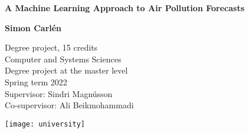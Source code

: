 \begin{titlepage}
    \begin{center}
        \vspace*{2cm}
            
        \Huge
        \textbf{A Machine Learning Approach to Air Pollution Forecasts}
            
        \vspace{0.25cm}
        
        \LARGE
            
        \vspace{1cm}
            
        \textbf{Simon Carlén}
            
        \vspace{250pt plus 1pt minus 1pt}
            
            
         
        	\vspace{.75cm}
	\large

	\begin{minipage}{0.65\textwidth}
	Degree project, 15 credits \\\indent
	Computer and Systems Sciences \\\indent
	Degree project at the master level \\\indent
	Spring term 2022 \\\indent 
	Supervisor: Sindri Magnússon \\\indent
	Co-supervisor: Ali Beikmohammadi
	\end{minipage}
	\begin{minipage}{0.32\textwidth}
	\begin{center}
    		\texttt{[image: university]}
	\end{center}
	\end{minipage}

    \end{center}
\end{titlepage}